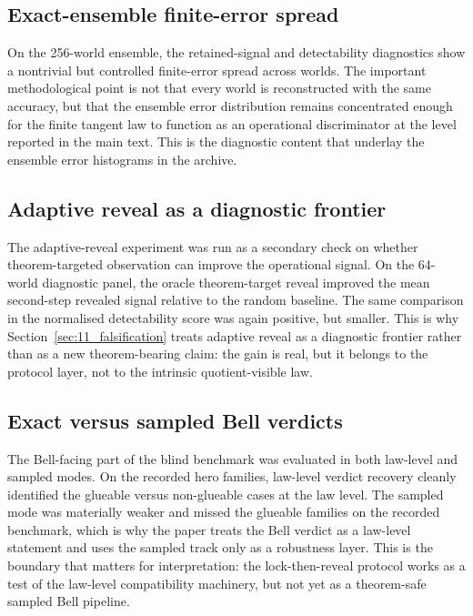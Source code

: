 \documentclass[11pt]{article}
\numberwithin{equation}{section}
\theoremstyle{thmcompact}
\theoremstyle{remark}
\begin{document}
\subsection{Exact-ensemble finite-error spread}

On the 256-world ensemble, the retained-signal and detectability diagnostics show a nontrivial but controlled finite-error spread across worlds. The important methodological point is not that every world is reconstructed with the same accuracy, but that the ensemble error distribution remains concentrated enough for the finite tangent law to function as an operational discriminator at the level reported in the main text. This is the diagnostic content that underlay the ensemble error histograms in the archive.

\subsection{Adaptive reveal as a diagnostic frontier}

The adaptive-reveal experiment was run as a secondary check on whether theorem-targeted observation can improve the operational signal. On the 64-world diagnostic panel, the oracle theorem-target reveal improved the mean second-step revealed signal relative to the random baseline. The same comparison in the normalised detectability score was again positive, but smaller. This is why Section~\ref{sec:11_falsification} treats adaptive reveal as a diagnostic frontier rather than as a new theorem-bearing claim: the gain is real, but it belongs to the protocol layer, not to the intrinsic quotient-visible law.

\subsection{Exact versus sampled Bell verdicts}

The Bell-facing part of the blind benchmark was evaluated in both law-level and sampled modes. On the recorded hero families, law-level verdict recovery cleanly identified the glueable versus non-glueable cases at the law level. The sampled mode was materially weaker and missed the glueable families on the recorded benchmark, which is why the paper treats the Bell verdict as a law-level statement and uses the sampled track only as a robustness layer. This is the boundary that matters for interpretation: the lock-then-reveal protocol works as a test of the law-level compatibility machinery, but not yet as a theorem-safe sampled Bell pipeline.
\end{document}
